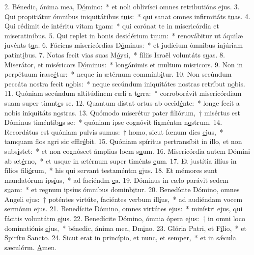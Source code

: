 2. Bénedic, ánima mea, D\uline{ó}mino:~* et noli oblivísci omnes retributións \uline{e}jus.
3. Qui propitiátur ómnibus iniquitátibus t\uline{u}is:~* qui sanat omnes infirmitáts t\uline{u}as.
4. Qui rédimit de intéritu vitam t\uline{u}am:~* qui corónat te in misericórdia et miseratin\uline{i}bus.
5. Qui replet in bonis desidérium t\uline{u}um:~* renovábitur ut áquilæ juvénts t\uline{u}a.
6. Fáciens misericórdias D\uline{ó}minus:~* et judícium ómnibus injúriam patint\uline{i}bus.
7. Notas fecit vias suas M\uline{ó}ysi,~* fíliis Israël voluntáts s\uline{u}as.
8. Miserátor, et miséricors D\uline{ó}minus:~* longánimis et multum misr\uline{i}cors.
9. Non in perpétuum irasc\uline{é}tur:~* neque in ætérnum comminb\uline{i}tur.
10. Non secúndum peccáta nostra fecit n\uline{o}bis:~* neque secúndum iniquitátes nostras retríbut n\uline{o}bis.
11. Quóniam secúndum altitúdinem cæli a t\uline{e}rra:~* corroborávit misericórdiam suam super timnt\uline{e}s se.
12. Quantum distat ortus ab occid\uline{é}nte:~* longe fecit a nobis iniquitáts n\uline{o}stras.
13. Quómodo miserétur pater filiórum,~† misértus est Dóminus timéntib\uline{u}s se:~* quóniam ipse cognóvit figméntm n\uline{o}strum.
14. Recordátus est quóniam pulvis sumus:~† homo, sicut fœnum dies \uline{e}jus,~* tamquam flos agri sic efflr\uline{é}bit.
15. Quóniam spíritus pertransíbit in illo, et non subs\uline{í}stet:~* et non cognóscet ámplius locm s\uline{u}um.
16. Misericórdia autem Dómini ab æt\uline{é}rno,~* et usque in ætérnum super timénts \uline{e}um.
17. Et justítia illíus in fílios fili\uline{ó}rum,~* his qui servant testaméntm \uline{e}jus.
18. Et mémores sunt mandatórum ips\uline{í}us,~* ad faciéndm \uline{e}a.
19. Dóminus in cælo parávit sedem s\uline{u}am:~* et regnum ipsíus ómnibus dominb\uline{i}tur.
20. Benedícite Dómino, omnes Angeli ejus:~† poténtes virtúte, faciéntes verbum ill\uline{í}us,~* ad audiéndam vocem sermónm \uline{e}jus.
21. Benedícite Dómino, omnes virtútes \uline{e}jus:~* minístri ejus, qui fácitis voluntátm \uline{e}jus.
22. Benedícite Dómino, ómnia ópera ejus:~† in omni loco dominatiónis \uline{e}jus,~* bénedic, ánima mea, Dm\uline{i}no.
23. Glória Patri, et F\uline{í}lio,~* et Spirítu S\uline{a}ncto.
24. Sicut erat in princípio, et nunc, et s\uline{e}mper,~* et in sǽcula sæculórm. \uline{A}men.
